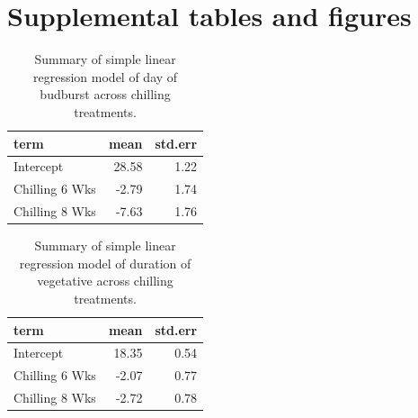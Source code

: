 \documentclass{article}\usepackage[]{graphicx}\usepackage[]{color}
\begin{document}
\section*{Supplemental tables and figures}

\begin{table}[H]
\centering
\caption{Summary of simple linear regression model of day of budburst across chilling treatments.} 
\label{tab:simpbb}
\begin{tabular}{lrr}
  \hline
term & mean & std.err \\ 
  \hline
Intercept & 28.58 & 1.22 \\ 
  Chilling 6 Wks & -2.79 & 1.74 \\ 
  Chilling 8 Wks & -7.63 & 1.76 \\ 
   \hline
\end{tabular}
\end{table}
\begin{table}[H]
\centering
\caption{Summary of simple linear regression model of duration of vegetative across chilling treatments.} 
\label{tab:simpdvr}
\begin{tabular}{lrr}
  \hline
term & mean & std.err \\ 
  \hline
Intercept & 18.35 & 0.54 \\ 
  Chilling 6 Wks & -2.07 & 0.77 \\ 
  Chilling 8 Wks & -2.72 & 0.78 \\ 
   \hline
\end{tabular}
\end{table}
\end{document}
